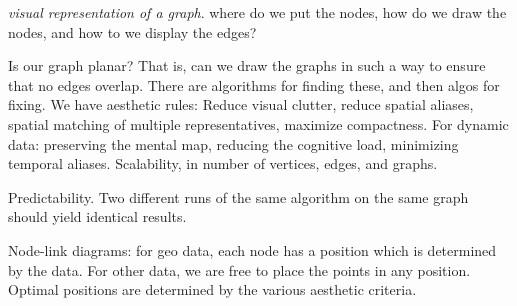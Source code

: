 \documentclass[]{article}
\begin{document}
\textit{visual representation of a graph}. where do we put the nodes, how do we draw the nodes, and how to we display the edges?

Is our graph planar? That is, can we draw the graphs in such a way to ensure that no edges overlap. There are algorithms for finding these, and then algos for fixing. We have aesthetic rules: Reduce visual clutter, reduce spatial aliases, spatial matching of multiple representatives, maximize compactness. For dynamic data: preserving the mental map, reducing the cognitive load, minimizing temporal aliases. Scalability, in number of vertices, edges, and graphs.

Predictability. Two different runs of the same algorithm on the same graph should yield identical results. 

Node-link diagrams: for geo data, each node has a position which is determined by the data. For other data, we are free to place the points in any position. Optimal positions are determined by the various aesthetic criteria. 
\end{document}
